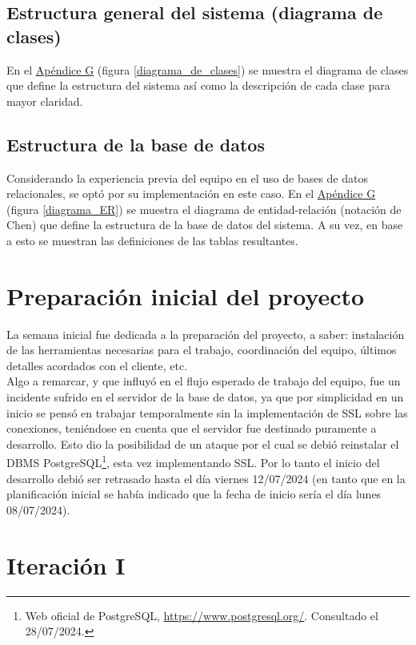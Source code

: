 \documentclass[a4paper, 12pt,twoside]{report}  %
\numberwithin{equation}{subsection} %
\begin{document}
\subsection{Estructura general del sistema (diagrama de clases)}
En el \hyperlink{apendice_g}{Apéndice G} (figura \ref{diagrama_de_clases}) se muestra el diagrama de clases que define la estructura del sistema así como la descripción de cada clase para mayor claridad.

\subsection{Estructura de la base de datos}
Considerando la experiencia previa del equipo en el uso de bases de datos relacionales, se optó por su implementación en este caso. En el \hyperlink{apendice_g}{Apéndice G} (figura \ref{diagrama_ER}) se muestra el diagrama de entidad-relación (notación de Chen) que define la estructura de la base de datos del sistema. A su vez, en base a esto se muestran las definiciones de las tablas resultantes.


\section{Preparación inicial del proyecto}
\indent La semana inicial fue dedicada a la preparación del proyecto, a saber: instalación de las herramientas necesarias para el trabajo, coordinación del equipo, últimos detalles acordados con el cliente, etc.\\
\indent Algo a remarcar, y que influyó en el flujo esperado de trabajo del equipo, fue un incidente sufrido en el servidor de la base de datos, ya que por simplicidad en un inicio se pensó en trabajar temporalmente sin la implementación de SSL sobre las conexiones, teniéndose en cuenta que el servidor fue destinado puramente a desarrollo. Esto dio la posibilidad de un ataque por el cual se debió reinstalar el DBMS PostgreSQL\footnote{Web oficial de PostgreSQL, \url{https://www.postgresql.org/}. Consultado el 28/07/2024.}, esta vez implementando SSL. Por lo tanto el inicio del desarrollo debió ser retrasado hasta el día viernes 12/07/2024 (en tanto que en la planificación inicial se había indicado que la fecha de inicio sería el día lunes 08/07/2024).

\section{Iteración I}
\label{descripcion_iteracion_I}
\end{document}
